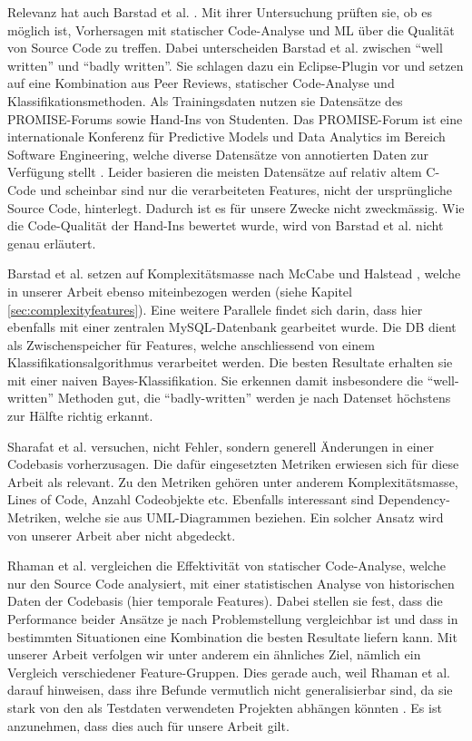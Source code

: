 \documentclass[10pt, a4paper]{article}
\begin{document}
Relevanz hat auch Barstad et al. \cite{barstad2014}. Mit ihrer Untersuchung prüften sie, ob es möglich ist, Vorhersagen mit statischer Code-Analyse und \ac{ML} über die Qualität von Source Code zu treffen. Dabei unterscheiden Barstad et al. zwischen ``well written'' und ``badly written''. Sie schlagen dazu ein Eclipse-Plugin vor und setzen auf eine Kombination aus Peer Reviews, statischer Code-Analyse und Klassifikationsmethoden. Als Trainingsdaten nutzen sie Datensätze des PROMISE-Forums \cite{promise} sowie Hand-Ins von Studenten. Das PROMISE-Forum ist eine internationale Konferenz für Predictive Models und Data Analytics im Bereich Software Engineering, welche diverse Datensätze von annotierten Daten zur Verfügung stellt \cite{promisedatasets}. Leider basieren die meisten Datensätze auf relativ altem C-Code und scheinbar sind nur die verarbeiteten Features, nicht der ursprüngliche Source Code, hinterlegt. Dadurch ist es für unsere Zwecke nicht zweckmässig. Wie die Code-Qualität der Hand-Ins bewertet wurde, wird von Barstad et al. nicht genau erläutert.

Barstad et al. setzen auf Komplexitätsmasse nach McCabe \cite{mccabe1976} und Halstead \cite{Halstead:1977:ESS:540137}, welche in unserer Arbeit ebenso miteinbezogen werden (siehe Kapitel \ref{sec:complexityfeatures}). Eine weitere Parallele findet sich darin, dass hier ebenfalls mit einer zentralen MySQL-Datenbank gearbeitet wurde. Die \ac{DB} dient als Zwischenspeicher für Features, welche anschliessend von einem Klassifikationsalgorithmus verarbeitet werden. 
Die besten Resultate erhalten sie mit einer naiven Bayes-Klassifikation. Sie erkennen damit insbesondere die ``well-written'' Methoden gut, die ``badly-written'' werden je nach Datenset höchstens zur Hälfte richtig erkannt.

Sharafat et al. \cite{Sharafat2008} versuchen, nicht Fehler, sondern generell Änderungen in einer Codebasis vorherzusagen. Die dafür eingesetzten Metriken erwiesen sich für diese Arbeit als relevant. Zu den Metriken gehören unter anderem Komplexitätsmasse, Lines of Code, Anzahl Codeobjekte etc. Ebenfalls interessant sind Dependency-Metriken, welche sie aus \acs{UML}-Diagrammen beziehen. Ein solcher Ansatz wird von unserer Arbeit aber nicht abgedeckt.

Rhaman et al. \cite{Rahman2014} vergleichen die Effektivität von statischer Code-Analyse, welche nur den Source Code analysiert, mit einer statistischen Analyse von historischen Daten der Codebasis (hier temporale Features). Dabei stellen sie fest, dass die Performance beider Ansätze je nach Problemstellung vergleichbar ist und dass in bestimmten Situationen eine Kombination die besten Resultate liefern kann. Mit unserer Arbeit verfolgen wir unter anderem ein ähnliches Ziel, nämlich ein Vergleich verschiedener Feature-Gruppen. Dies gerade auch, weil Rhaman et al. darauf hinweisen, dass ihre Befunde vermutlich nicht generalisierbar sind, da sie stark von den als Testdaten verwendeten Projekten abhängen könnten \cite{Rahman2014p10}. Es ist anzunehmen, dass dies auch für unsere Arbeit gilt.
\end{document}
